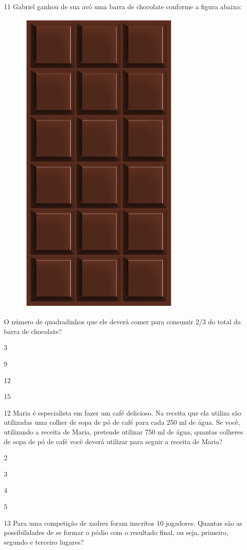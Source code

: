 \pagebreak
\num{11} Gabriel ganhou de sua avó uma barra de chocolate conforme a 
figura abaixo:

\begin{figure}[htpb!]
\centering
\includegraphics[width=.2\textwidth]{../ilustracoes/MAT5/SAEB_5ANO_MAT_figura120.png}
\end{figure}

O número de quadradinhos que ele deverá comer para consumir 2/3 do total
da barra de chocolate?

\begin{minipage}{.5\textwidth}
\begin{escolha}
\item
  3
\item
  9
\item
  12
\item
  15
\end{escolha}
\end{minipage}



\num{12} Maria é especialista em fazer um café delicioso. Na receita 
que ela utiliza são utilizadas uma colher de sopa de pó de café para cada
250 ml de água. Se você, utilizando a receita de Maria, pretende
utilizar 750 ml de água, quantas colheres de sopa de pó de café você
deverá utilizar para seguir a receita de Maria?

\begin{minipage}{.5\textwidth}
\begin{escolha}
\item
  2
\item
  3
\item
  4
\item
  5
\end{escolha}
\end{minipage}


\pagebreak
\num{13} Para uma competição de xadrez foram inscritos 10 jogadores.
Quantas são as possibilidades de se formar o pódio com o resultado 
final, ou seja, primeiro, segundo e terceiro lugares?

